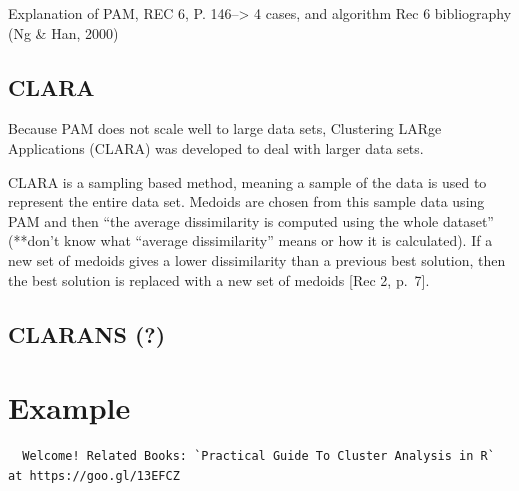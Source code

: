 \documentclass[12pt,twoside]{amherstthesis}
\begin{document}
  Explanation of PAM, REC 6, P. 146--\textgreater{} 4 cases, and algorithm
  Rec 6 bibliography (Ng \& Han, 2000)
  
  \section{CLARA}\label{clara}
  
  Because PAM does not scale well to large data sets, Clustering LARge
  Applications (CLARA) was developed to deal with larger data sets.
  
  CLARA is a sampling based method, meaning a sample of the data is used
  to represent the entire data set. Medoids are chosen from this sample
  data using PAM and then ``the average dissimilarity is computed using
  the whole dataset'' (**don't know what ``average dissimilarity'' means
  or how it is calculated). If a new set of medoids gives a lower
  dissimilarity than a previous best solution, then the best solution is
  replaced with a new set of medoids {[}Rec 2, p.~7{]}.
  
  \section{CLARANS (?)}\label{clarans}
  
  \chapter{Example}\label{typeset-equ}
  
  \begin{Shaded}
  \begin{Highlighting}[]
  \end{Highlighting}
  \end{Shaded}
  
  \begin{verbatim}
  Welcome! Related Books: `Practical Guide To Cluster Analysis in R` at https://goo.gl/13EFCZ
  \end{verbatim}
  
  \begin{Shaded}
  \begin{Highlighting}[]
  \end{Highlighting}
  \end{Shaded}
  
\end{document}
